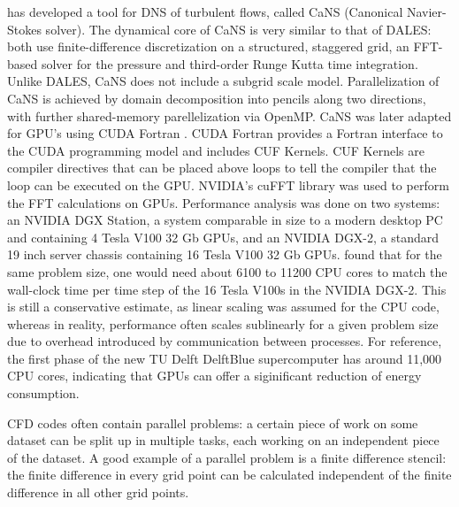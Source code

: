 \citet{costaFFTbasedFinitedifferenceSolver2018} has developed a tool for DNS of turbulent flows, called CaNS (Canonical Navier-Stokes solver). The dynamical core of CaNS is very similar to that of DALES: both use finite-difference discretization on a structured, staggered grid, an FFT-based solver for the pressure and third-order Runge Kutta time integration. Unlike DALES, CaNS does not include a subgrid scale model. Parallelization of CaNS is achieved by domain decomposition into pencils along two directions, with further shared-memory parellelization via OpenMP.
CaNS was later adapted for GPU's using CUDA Fortran \citep{costaGPUAccelerationCaNS2021}. CUDA Fortran provides a Fortran interface to the CUDA programming model and includes CUF Kernels. CUF Kernels are compiler directives that can be placed above loops to tell the compiler that the loop can be executed on the GPU. NVIDIA's cuFFT library was used to perform the FFT calculations on GPUs. Performance analysis was done on two systems: an NVIDIA DGX Station, a system comparable in size to a modern desktop PC and containing 4 Tesla V100 32 Gb GPUs, and an NVIDIA DGX-2, a standard 19 inch server chassis containing 16 Tesla V100 32 Gb GPUs. \citet{costaGPUAccelerationCaNS2021} found that for the same problem size, one would need about 6100 to 11200 CPU cores to match the wall-clock time per time step of the 16 Tesla V100s in the NVIDIA DGX-2. This is still a conservative estimate, as linear scaling was assumed for the CPU code, whereas in reality, performance often scales sublinearly for a given problem size due to overhead introduced by communication between processes. For reference, the first phase of the new TU Delft DelftBlue supercomputer has around 11,000 CPU cores, indicating that GPUs can offer a siginificant reduction of energy consumption.



CFD codes often contain parallel problems: a certain piece of work on some dataset can be split up in multiple tasks, each working on an independent piece of the dataset. A good example of a parallel problem is a finite difference stencil: the finite difference in every grid point can be calculated independent of the finite difference in all other grid points. 